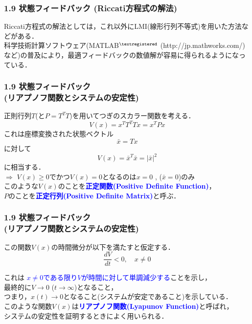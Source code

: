 \documentclass[10pt]{beamer}
\begin{document}
\begin{frame}[t]
\frametitle{1.9 状態フィードバック (Riccati方程式の解法)}
Riccati方程式の解法としては，これ以外にLMI(線形行列不等式)を用いた方法などがある．
\\

科学技術計算ソフトウェア(MATLAB$^{\tiny \textregistered}$ (http://jp.mathworks.com/)など)の普及により，最適フィードバックの数値解が容易に得られるようになっている．

\end{frame}

\begin{frame}[t]
\frametitle{1.9 状態フィードバック \\ (リアプノフ関数とシステムの安定性)}
正則行列$T$(と$P=T^T T$)を用いてつぎのスカラー関数を考える．
\begin{equation}
 V(x) = x^T T^T T x = x^T P x
\end{equation}
これは座標変換された状態ベクトル
\begin{equation}
 \bar{x} = T x
\end{equation}
に対して
\begin{equation}
 V(x) = \bar{x}^T \bar{x} = | \bar{x} | ^2
\end{equation}
に相当する．\\
$\Longrightarrow$ $V(x) \geq 0$でかつ$V(x) = 0$となるのは$x=0$
, ($\bar{x} = 0 $)のみ\\
このような$V(x)$のことを\textcolor{blue}{\bf 正定関数(Positive Definite Function)}，\\
$P$のことを\textcolor{blue}{\bf 正定行列(Positive Definite Matrix)}と呼ぶ．
\end{frame}


\begin{frame}[t]
\frametitle{1.9 状態フィードバック \\ (リアプノフ関数とシステムの安定性)}
この関数$V(x)$の時間微分が以下を満たすと仮定する．
\begin{equation}
 \frac{d V}{d t} < 0, \quad x \neq 0
  
\end{equation}

これは \textcolor{blue}{$x \neq 0$である限り$V$が時間に対して単調減少する}ことを示し，\\
最終的に$ V \rightarrow 0$ ($t \rightarrow \infty$)となること，\\
つまり，$x(t) \rightarrow 0$となること(システムが安定であること)を示している．\\
 
このような関数$V(x)$は\textcolor{blue}{\bf リアプノフ関数(Lyapunov Function)}と呼ばれ，\\
システムの安定性を証明するときによく用いられる．
\end{frame}
\end{document}
